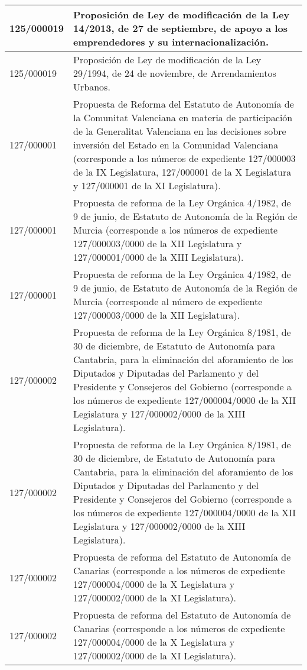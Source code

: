 {\begin{table}[H]
\begin{center}
\begin{tabularx}{\linewidth}{| l | X |}
\hline
125/000019 & Proposición de Ley de modificación de la Ley 14/2013, de 27 de septiembre, de apoyo a los emprendedores y su internacionalización. \\
\hline
125/000019 & Proposición de Ley de modificación de la Ley 29/1994, de 24 de noviembre, de Arrendamientos Urbanos. \\
\hline
127/000001 & Propuesta de Reforma del Estatuto de Autonomía de la Comunitat Valenciana en materia de participación de la Generalitat Valenciana en las decisiones sobre inversión del Estado en la Comunidad Valenciana (corresponde a los números de expediente 127/000003 de la IX Legislatura, 127/000001 de la X Legislatura y 127/000001 de la XI Legislatura). \\
\hline
127/000001 & Propuesta de reforma de la Ley Orgánica 4/1982, de 9 de junio, de Estatuto de Autonomía de la Región de Murcia (corresponde a los números de expediente 127/000003/0000 de la XII Legislatura y 127/000001/0000 de la XIII Legislatura). \\
\hline
127/000001 & Propuesta de reforma de la Ley Orgánica 4/1982, de 9 de junio, de Estatuto de Autonomía de la Región de Murcia (corresponde al número de expediente 127/000003/0000 de la XII Legislatura). \\
\hline
127/000002 & Propuesta de reforma de la Ley Orgánica 8/1981, de 30 de diciembre, de Estatuto de Autonomía para Cantabria, para la eliminación del aforamiento de los Diputados y Diputadas del Parlamento y del Presidente y Consejeros del Gobierno (corresponde a los números de expediente 127/000004/0000 de la XII Legislatura y 127/000002/0000 de la XIII Legislatura). \\
\hline
127/000002 & Propuesta de reforma de la Ley Orgánica 8/1981, de 30 de diciembre, de Estatuto de Autonomía para Cantabria, para la eliminación del aforamiento de los Diputados y Diputadas del Parlamento y del Presidente y Consejeros del Gobierno (corresponde a los números de expediente 127/000004/0000 de la XII Legislatura y 127/000002/0000 de la XIII Legislatura). \\
\hline
127/000002 & Propuesta de reforma del Estatuto de Autonomía de Canarias (corresponde a los números de expediente 127/000004/0000 de la X Legislatura y 127/000002/0000 de la XI Legislatura). \\
\hline
127/000002 & Propuesta de reforma del Estatuto de Autonomía de Canarias (corresponde a los números de expediente 127/000004/0000 de la X Legislatura y 127/000002/0000 de la XI Legislatura). \\

\end{tabularx}
\end{center}
\end{table}}
